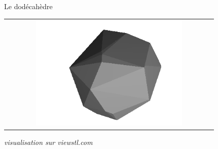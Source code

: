 \begin{frame}{Le dodécahèdre}
\begin{minipage}{0.60\textwidth}
\begin{tabular}{c}
        \includegraphics[width=0.72\textwidth]{capture/dodec_vrai.png} \\
    \end{tabular}
    \vspace{0.5em}

    {\tiny \textit{visualisation sur viewstl.com}}
\end{minipage}
\end{frame}



